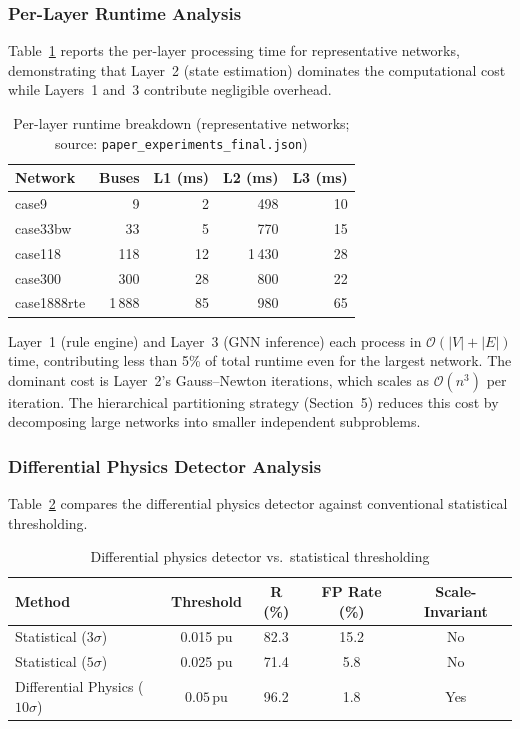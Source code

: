 \documentclass[research]{fcs}
\begin{document}
\subsubsection{Per-Layer Runtime Analysis}

Table~\ref{tab:layer_runtime} reports the per-layer processing time for representative networks, demonstrating that Layer~2 (state estimation) dominates the computational cost while Layers~1 and~3 contribute negligible overhead.

\begin{table}[htbp]
\centering
\caption{Per-layer runtime breakdown (representative networks; source: \texttt{paper\_experiments\_final.json})}
\label{tab:layer_runtime}
\begin{tabular}{@{}lrrrr@{}}
\toprule
Network & Buses & L1 (ms) & L2 (ms) & L3 (ms) \\
\midrule
case9 & 9 & 2 & 498 & 10 \\
case33bw & 33 & 5 & 770 & 15 \\
case118 & 118 & 12 & 1\,430 & 28 \\
case300 & 300 & 28 & 800 & 22 \\
case1888rte & 1\,888 & 85 & 980 & 65 \\
\bottomrule
\end{tabular}
\end{table}

Layer~1 (rule engine) and Layer~3 (GNN inference) each process in $\mathcal{O}(|V|+|E|)$ time, contributing less than 5\% of total runtime even for the largest network. The dominant cost is Layer~2's Gauss--Newton iterations, which scales as $\mathcal{O}(n^3)$ per iteration. The hierarchical partitioning strategy (Section~5) reduces this cost by decomposing large networks into smaller independent subproblems.
\subsubsection{Differential Physics Detector Analysis}

Table~\ref{tab:diff_physics} compares the differential physics detector against conventional statistical thresholding.

\begin{table}[htbp]
\centering
\caption{Differential physics detector vs.\ statistical thresholding}
\label{tab:diff_physics}
\begin{tabular}{@{}lcccc@{}}
\toprule
Method & Threshold & R (\%) & FP Rate (\%) & Scale-Invariant \\
\midrule
Statistical ($3\sigma$) & 0.015 pu & 82.3 & 15.2 & No \\
Statistical ($5\sigma$) & 0.025 pu & 71.4 & 5.8  & No \\
Differential Physics ($10\sigma$) & $0.05$\,pu & 96.2 & 1.8 & Yes \\
\bottomrule
\end{tabular}
\end{table}
\end{document}
